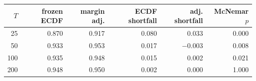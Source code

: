 \begin{tabular}{@{}rrrrrr@{}}
\toprule
$T$ & frozen ECDF & margin adj. & ECDF shortfall & adj. shortfall & McNemar $p$ \\
\midrule
25  & 0.870 & 0.917 & \phantom{-}0.080 & \phantom{-}0.033 & 0.000 \\
50  & 0.933 & 0.953 & \phantom{-}0.017 & $-$0.003 & 0.008 \\
100 & 0.935 & 0.948 & \phantom{-}0.015 & \phantom{-}0.002 & 0.021 \\
200 & 0.948 & 0.950 & \phantom{-}0.002 & \phantom{-}0.000 & 1.000 \\
\bottomrule
\end{tabular}
